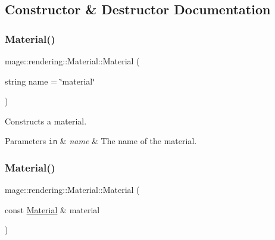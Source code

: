 \subsection{Constructor \& Destructor Documentation}
\mbox{\label{classmage_1_1rendering_1_1_material_a0d23055b62f54a28c77010412099a446}} 
\subsubsection{\texorpdfstring{Material()}{Material()}\hspace{0.1cm}{\footnotesize\ttfamily [1/3]}}
{\footnotesize\ttfamily mage\+::rendering\+::\+Material\+::\+Material (\begin{DoxyParamCaption}\item[{string}]{name = {\ttfamily \char`\"{}material\char`\"{}} }\end{DoxyParamCaption})\hspace{0.3cm}{\ttfamily [explicit]}}

Constructs a material.


\begin{DoxyParams}[1]{Parameters}
\mbox{\tt in}  & {\em name} & The name of the material. \\
\hline
\end{DoxyParams}
\mbox{\label{classmage_1_1rendering_1_1_material_ac7cffca59fe250f10c2e68a875a03e91}} 
\subsubsection{\texorpdfstring{Material()}{Material()}\hspace{0.1cm}{\footnotesize\ttfamily [2/3]}}
{\footnotesize\ttfamily mage\+::rendering\+::\+Material\+::\+Material (\begin{DoxyParamCaption}\item[{const \mbox{\hyperlink{classmage_1_1rendering_1_1_material}{Material}} \&}]{material }\end{DoxyParamCaption})\hspace{0.3cm}{\ttfamily [default]}}


